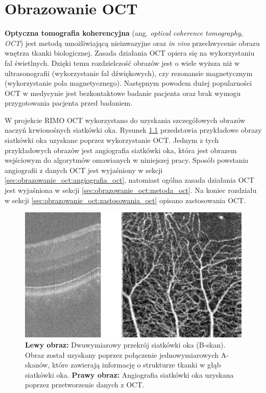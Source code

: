 %
\chapter{Obrazowanie OCT}
\label{sec:obrazowanie_oct}


\textbf{Optyczna tomografia koherencyjna} (ang. \textit{optical coherence tomography, OCT}) jest metodą umożliwiającą nieinwazyjne oraz \textit{in vivo} przechwycenie obrazu wnętrza tkanki biologicznej. Zasada działania OCT opiera się na wykorzystaniu fal świetlnych. Dzięki temu rozdzielczość obrazów jest o wiele wyższa niż w ultrasonografii (wykorzystanie fal dźwiękowych), czy rezonansie magnetycznym (wykorzystanie pola magnetycznego). Następnym powodem dużej popularności OCT w medycynie jest bezkontaktowe badanie pacjenta oraz brak wymogu przygotowania pacjenta przed badaniem.

W projekcie RIMO OCT wykorzystano do uzyskania szczegółowych obrazów naczyń krwionośnych siatkówki oka. Rysunek \ref{fig:obrazowanie_oct:bscan_vessels} przedstawia przykładowe obrazy siatkówki oka uzyskane poprzez wykorzystanie OCT. Jednym z tych przykładowych obrazów jest angiografia siatkówki oka, która jest obrazem wejściowym do algorytmów omawianych w niniejszej pracy. Sposób powstania angiografii z danych OCT jest wyjaśniony w sekcji \ref{sec:obrazowanie_oct:angiografia_oct}, natomiast ogólna zasada działania OCT jest wyjaśniona w sekcji \ref{sec:obrazowanie_oct:metoda_oct}. Na koniec rozdziału w sekcji \ref{sec:obrazowanie_oct:zastosowania_oct} opisano zastosowania OCT.

\begin{figure}[htb]
	\centering
	\includegraphics[width=\textwidth]{gfx/bscan_vessels}
	\caption{\textbf{Lewy obraz:} Dwuwymiarowy przekrój siatkówki oka (B-skan). Obraz został uzyskany poprzez połączenie jednowymiarowych A-skanów, które zawierają informację o strukturze tkanki w głąb siatkówki oka. \textbf{Prawy obraz:} Angiografia siatkówki oka uzyskana poprzez przetworzenie danych z OCT.}
	\label{fig:obrazowanie_oct:bscan_vessels}
\end{figure}

